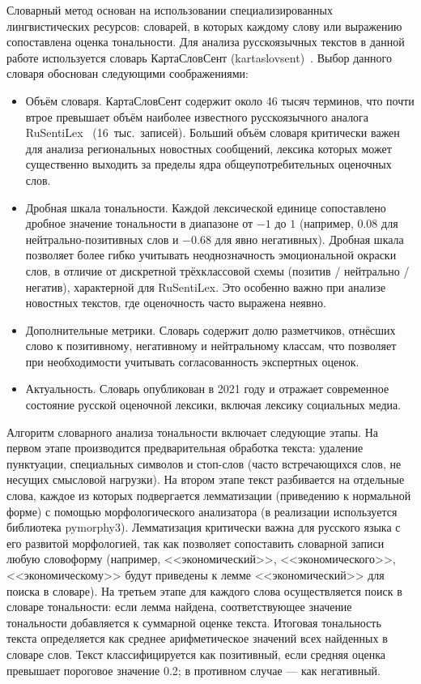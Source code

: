 \documentclass[master, och, coursework]{SCWorks1}
\begin{document}
Словарный метод основан на использовании специализированных лингвистических ресурсов: словарей, в которых каждому слову или выражению сопоставлена оценка тональности. Для анализа русскоязычных текстов в данной работе используется словарь КартаСловСент (kartaslovsent)~\cite{Kartaslovsent}. Выбор данного словаря обоснован следующими соображениями:

\begin{itemize}
\item Объём словаря. КартаСловСент содержит около 46 тысяч терминов, что почти втрое превышает объём наиболее известного русскоязычного аналога RuSentiLex~\cite{Loukachevitch2016} (\mbox{16 тыс. записей}). Больший объём словаря критически важен для анализа региональных новостных сообщений, лексика которых может существенно выходить за пределы ядра общеупотребительных оценочных слов.
\item Дробная шкала тональности. Каждой лексической единице сопоставлено дробное значение тональности в диапазоне от \(-1\) до \(1\) (например, 0.08 для нейтрально-позитивных слов и \(-0.68\) для явно негативных). Дробная шкала позволяет более гибко учитывать неоднозначность эмоциональной окраски слов, в отличие от дискретной трёхклассовой схемы (позитив / нейтрально / негатив), характерной для RuSentiLex. Это особенно важно при анализе новостных текстов, где оценочность часто выражена неявно.
\item Дополнительные метрики. Словарь содержит долю разметчиков, отнёсших слово к позитивному, негативному и нейтральному классам, что позволяет при необходимости учитывать согласованность экспертных оценок.
\item Актуальность. Словарь опубликован в 2021 году и отражает современное состояние русской оценочной лексики, включая лексику социальных медиа.
\end{itemize}

Алгоритм словарного анализа тональности включает следующие этапы. На первом этапе производится предварительная обработка текста: удаление пунктуации, специальных символов и стоп-слов (часто встречающихся слов, не несущих смысловой нагрузки). На втором этапе текст разбивается на отдельные слова, каждое из которых подвергается лемматизации (приведению к нормальной форме) с помощью морфологического анализатора (в реализации используется библиотека pymorphy3). Лемматизация критически важна для русского языка с его развитой морфологией, так как позволяет сопоставить словарной записи любую словоформу (например, <<экономический>>, <<экономического>>, <<экономическому>> будут приведены к лемме <<экономический>> для поиска в словаре). На третьем этапе для каждого слова осуществляется поиск в словаре тональности: если лемма найдена, соответствующее значение тональности добавляется к суммарной оценке текста. Итоговая тональность текста определяется как среднее арифметическое значений всех найденных в словаре слов. Текст классифицируется как позитивный, если средняя оценка превышает пороговое значение 0.2; в противном случае --- как негативный.
\end{document}
